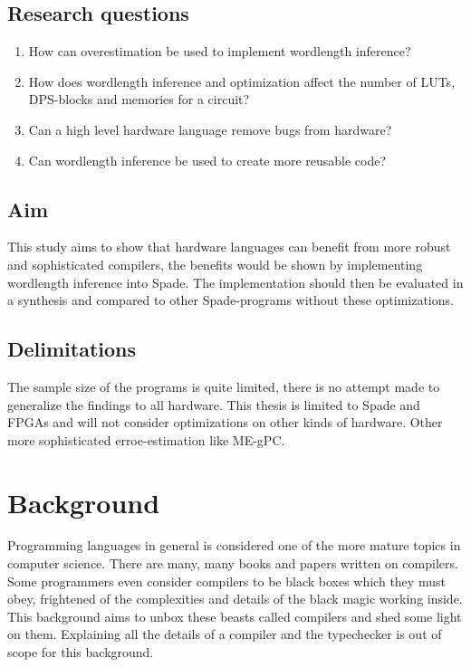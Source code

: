 \documentclass[msc,lith,english]{liuthesis}
\begin{document}
\section{Research questions}
\begin{enumerate}
  \item How can overestimation be used to implement wordlength inference?
  \item How does wordlength inference and optimization affect the number of LUTs, DPS-blocks and memories for a circuit?
  \item Can a high level hardware language remove bugs from hardware?
  \item Can wordlength inference be used to create more reusable code?
\end{enumerate}

\section{Aim}
This study aims to show that hardware languages can benefit from more robust and sophisticated compilers, the benefits would be shown by implementing wordlength inference into Spade. The implementation should then be evaluated in a synthesis and compared to other Spade-programs without these optimizations.

\section{Delimitations}
The sample size of the programs is quite limited, there is no attempt made to generalize the findings to all hardware. This thesis is limited to Spade and FPGAs and will not consider optimizations on other kinds of hardware. Other more sophisticated erroe-estimation like ME-gPC.

\chapter{Background}
\label{chaBackground}
Programming languages in general is considered one of the more mature topics in computer science. There are many, many books and papers written on compilers. Some programmers even consider compilers to be black boxes which they must obey, frightened of the complexities and details of the black magic working inside. This background aims to unbox these beasts called compilers and shed some light on them. Explaining all the details of a compiler and the typechecker is out of scope for this background.
\end{document}
